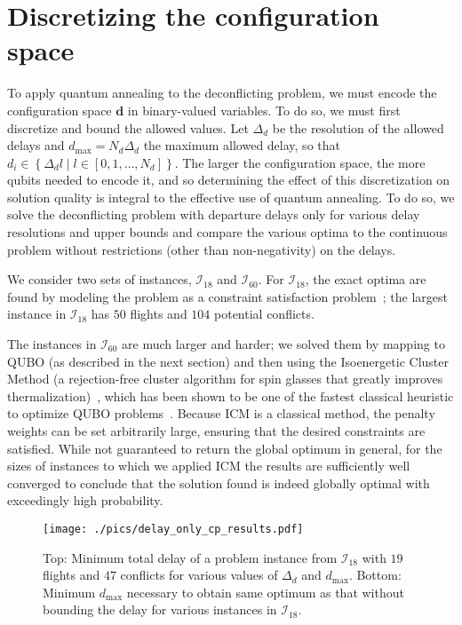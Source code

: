 \section{Discretizing the configuration space}
To apply quantum annealing to the deconflicting problem, we must encode the configuration space $\mathbf d$ in binary-valued variables.
To do so, we must first discretize and bound the allowed values.
Let $\Delta_d$ be the resolution of the allowed delays and $d_{\max} = N_d \Delta_d$ the maximum allowed delay, so that $d_i \in \left\{\Delta_d l \middle| l \in [0, 1, \ldots, N_d]\right\}$.
The larger the configuration space, the more qubits needed to encode it, and so determining the effect of this discretization on solution quality is integral to the effective use of quantum annealing.
To do so, we solve the deconflicting problem with departure delays only for various delay resolutions and upper bounds and compare the various optima to the continuous problem without restrictions (other than non-negativity) on the delays.

We consider two sets of instances, $\mathcal I_{18}$ and $\mathcal I_{60}$.
For $\mathcal I_{18}$, the exact optima are found by modeling the problem as a constraint satisfaction problem~\cite{numberjack}; the largest instance in $\mathcal I_{18}$ has $50$ flights and $104$ potential conflicts.

The instances in $\mathcal I_{60}$ are much larger and harder; we solved them by mapping to QUBO (as described in the next section) and then using the Isoenergetic Cluster Method (a
rejection-free cluster algorithm for spin glasses that greatly improves
thermalization)~\cite{zhu2015}, which has been shown to be one of the fastest
classical heuristic to optimize QUBO problems~\cite{mandra2016}.
Because ICM is a classical method, the penalty weights can be set arbitrarily large, ensuring that the desired constraints are satisfied.
While not guaranteed to return the global optimum in general, for the sizes of instances to which we applied ICM the results are sufficiently well converged to conclude that the solution found is indeed globally optimal with exceedingly high probability.


\begin{figure}[htpb]
\centering
\texttt{[image: ./pics/delay\_only\_cp\_results.pdf]}
\caption[Effect of discretization on solution quality]{Top: Minimum total delay of a problem instance from $\mathcal{I}_{18}$ with $19$ flights and $47$ conflicts for various values of $\Delta_d$ and $d_{\max}$.
Bottom: Minimum $d_\text{max}$ necessary to obtain same optimum as that without bounding the delay for various instances in $\mathcal I_{18}$.}
\label{fig:delay_only_cp_results}
\end{figure}


